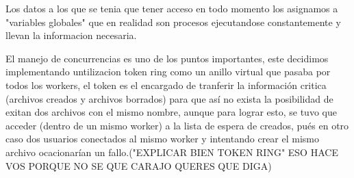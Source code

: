 \documentclass[11pt]{article}
\begin{document}
Los datos a los que se tenia que tener acceso en todo momento los asignamos a "variables globales" que en realidad son procesos ejecutandose constantemente y llevan la informacion necesaria.

El manejo de concurrencias es uno de los puntos importantes, este decidimos implementando untilizacion token ring como un anillo virtual que pasaba por todos los workers, el token es el encargado de tranferir la información critica (archivos creados y archivos borrados) para que así no exista la posibilidad de exitan dos archivos con el mismo nombre, aunque para lograr esto, se tuvo que acceder (dentro de un mismo worker) a la lista de espera de creados, pués en otro caso dos usuarios conectados al mismo worker y intentando crear el mismo archivo ocacionarían un fallo.("EXPLICAR BIEN TOKEN RING" ESO HACE VOS PORQUE NO SE QUE CARAJO QUERES QUE DIGA)
\end{document}
